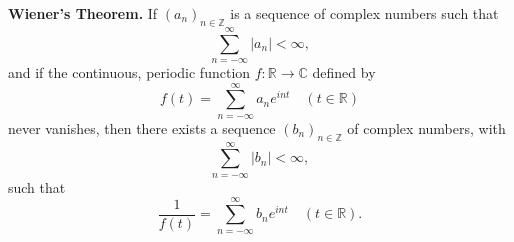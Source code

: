 \textbf{Wiener's Theorem.} If $(a_n)_{n \in \mathbb{Z}}$ is a sequence of complex numbers such that
$$\sum_{n=-\infty}^{\infty} |a_n| < \infty,$$
and if the continuous, periodic function $f: \mathbb{R} \to \mathbb{C}$ defined by
$$f(t) = \sum_{n=-\infty}^{\infty} a_n e^{int} \quad (t \in \mathbb{R})$$
never vanishes, then there exists a sequence $(b_n)_{n \in \mathbb{Z}}$ of complex numbers, with
$$\sum_{n=-\infty}^{\infty} |b_n| < \infty,$$
such that
$$\frac{1}{f(t)} = \sum_{n=-\infty}^{\infty} b_n e^{int} \quad (t \in \mathbb{R}).$$
